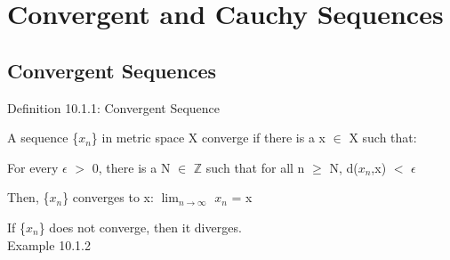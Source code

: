 \newpage

\section[Day 10: Convergence \& Cauchy Sequences]{Convergent and Cauchy Sequences}

\subsection{Convergent Sequences}

{ \color{blue} Definition 10.1.1: Convergent Sequence } 

    \begin{adjustbox}{minipage=14cm, right, vspace=0.1cm 0cm}
        A sequence \{$x_n$\} in metric space X converge if
        there is a x $\in$ X such that:

        \hspace{1cm}
        For every $\epsilon$ $>$ 0, there is a N $\in$ $\mathbb{Z}$ such that
        for all n $\geq$ N, d($x_n$,x) $<$ $\epsilon$
        
        Then, \{$x_n$\} converges to x: \hspace{1cm}
        $\lim_{n \rightarrow \infty}$ $x_n$ = x

        If \{$x_n$\} does not converge, then it diverges. \\
	\end{adjustbox}

{ \color{purple} Example 10.1.2 }

